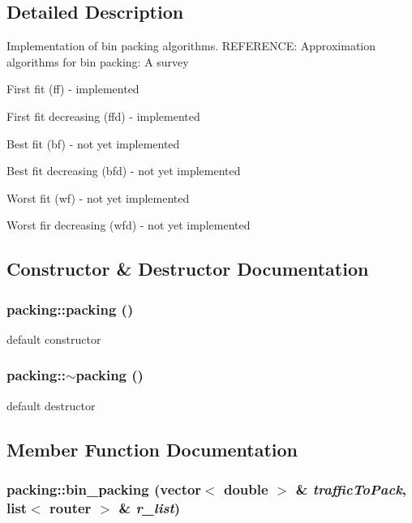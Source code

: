 \subsection{Detailed Description}
Implementation of bin packing algorithms. REFERENCE: Approximation algorithms for bin packing: A survey
\begin{DoxyItemize}
\item First fit (ff) -\/ implemented
\item First fit decreasing (ffd) -\/ implemented
\item Best fit (bf) -\/ not yet implemented
\item Best fit decreasing (bfd) -\/ not yet implemented
\item Worst fit (wf) -\/ not yet implemented
\item Worst fir decreasing (wfd) -\/ not yet implemented 
\end{DoxyItemize}

\subsection{Constructor \& Destructor Documentation}
\hypertarget{classpacking_ad0cae9459a9abfe4bf76642a232ec2f3}{
\subsubsection[{packing}]{\setlength{\rightskip}{0pt plus 5cm}packing::packing ()}}
\label{classpacking_ad0cae9459a9abfe4bf76642a232ec2f3}


default constructor 

\hypertarget{classpacking_a985cd1712c1e0c7e9f3927e847383810}{
\subsubsection[{$\sim$packing}]{\setlength{\rightskip}{0pt plus 5cm}packing::$\sim$packing ()}}
\label{classpacking_a985cd1712c1e0c7e9f3927e847383810}


default destructor 



\subsection{Member Function Documentation}
\hypertarget{classpacking_aa80d123e13482fc9760fd87e44f27e0f}{
\subsubsection[{bin\_\-packing}]{ packing::bin\_\-packing (vector$<$ double $>$ \& {\em trafficToPack}, \/  list$<$ {\bf router} $>$ \& {\em r\_\-list})}}
\label{classpacking_aa80d123e13482fc9760fd87e44f27e0f}


